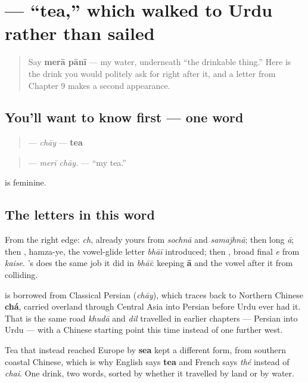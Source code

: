 \section[\texorpdfstring{\ur{چائے} (chāy)}{چائے (chāy)}]{ — \textquotedblleft{}tea,\textquotedblright{} which walked to Urdu rather than sailed}

\label{lesson:UR-C12-chai}



\begin{quote}
Say \textbf{merā pānī} — my water, underneath \textquotedblleft{}the drinkable thing.\textquotedblright{} Here is the drink you would politely ask for right after it, and a letter from Chapter 9 makes a second appearance.
\end{quote}

\subsection*{You'll want to know first — one word}
\begin{quote}
\textbf{} — \emph{chāy} — \textbf{tea}
\end{quote}

\begin{quote}
\textbf{ } — \emph{merī chāy.} — \textquotedblleft{}my tea.\textquotedblright{}
\end{quote}

\textbf{} is feminine.

\subsection*{The letters in this word}
From the right edge: \textbf{} \emph{ch}, already yours from \emph{sochnā} and \emph{samajhnā}; then \textbf{} long \emph{ā}; then \textbf{}, hamza-ye, the vowel-glide letter \emph{bhāī} introduced; then \textbf{}, broad final \emph{e} from \emph{kaise}. \textbf{}'s \textbf{} does the same job it did in \emph{bhāī}: keeping \textbf{ā} and the vowel after it from colliding.

\begin{cousinweb}
\textbf{} is borrowed from Classical Persian \textbf{} (\emph{chāy}), which traces back to Northern Chinese \textbf{chá}, carried overland through Central Asia into Persian before Urdu ever had it. That is the same road \emph{khudā} and \emph{dil} travelled in earlier chapters — Persian into Urdu — with a Chinese starting point this time instead of one further west.

Tea that instead reached Europe by \textbf{sea} kept a different form, from southern coastal Chinese, which is why English says \textbf{tea} and French says \emph{thé} instead of \emph{chai}. One drink, two words, sorted by whether it travelled by land or by water.
\end{cousinweb}

